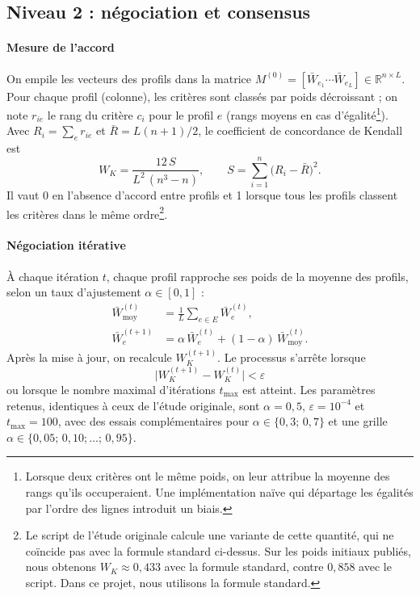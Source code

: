 \documentclass[11pt,a4paper]{article}
\newcommand{\Wbar}{\bar{W}}
\newcommand{\Wmoy}{\bar{W}_{\mathrm{moy}}}
\begin{document}
\subsection{Niveau 2 : négociation et consensus}

\paragraph{Mesure de l'accord} On empile les vecteurs des profils dans la matrice $M^{(0)}=[\Wbar_{e_1}\cdots\Wbar_{e_L}]\in\mathbb{R}^{n\times L}$. Pour chaque profil (colonne), les critères sont classés par poids décroissant ; on note $r_{ie}$ le rang du critère $c_i$ pour le profil $e$ (rangs moyens en cas d'égalité\footnote{Lorsque deux critères ont le même poids, on leur attribue la moyenne des rangs qu'ils occuperaient. Une implémentation naïve qui départage les égalités par l'ordre des lignes introduit un biais.}). Avec $R_i=\sum_e r_{ie}$ et $\bar R=L(n+1)/2$, le coefficient de concordance de Kendall~\cite{kendall} est
\begin{equation}\label{eq:kendall}
  W_K=\frac{12\,S}{L^2\,(n^3-n)},\qquad S=\sum_{i=1}^{n}\bigl(R_i-\bar R\bigr)^2 .
\end{equation}
Il vaut 0 en l'absence d'accord entre profils et 1 lorsque tous les profils classent les critères dans le même ordre\footnote{Le script de l'étude originale calcule une variante de cette quantité, qui ne coïncide pas avec la formule standard ci-dessus. Sur les poids initiaux publiés, nous obtenons $W_K\approx0{,}433$ avec la formule standard, contre $0{,}858$ avec le script. Dans ce projet, nous utilisons la formule standard.}.

\paragraph{Négociation itérative} À chaque itération $t$, chaque profil rapproche ses poids de la moyenne des profils, selon un taux d'ajustement $\alpha\in[0,1]$ :
\begin{align}
  \Wmoy^{(t)} &= \frac{1}{L}\sum_{e\in E}\Wbar_e^{(t)}, \label{eq:moy}\\
  \Wbar_e^{(t+1)} &= \alpha\,\Wbar_e^{(t)}+(1-\alpha)\,\Wmoy^{(t)} . \label{eq:maj}
\end{align}
Après la mise à jour, on recalcule $W_K^{(t+1)}$. Le processus s'arrête lorsque
\begin{equation}\label{eq:arret}
  \bigl|W_K^{(t+1)}-W_K^{(t)}\bigr|<\varepsilon
\end{equation}
ou lorsque le nombre maximal d'itérations $t_{\max}$ est atteint. Les paramètres retenus, identiques à ceux de l'étude originale, sont $\alpha=0{,}5$, $\varepsilon=10^{-4}$ et $t_{\max}=100$, avec des essais complémentaires pour $\alpha\in\{0{,}3;\,0{,}7\}$ et une grille $\alpha\in\{0{,}05;\,0{,}10;\dots;\,0{,}95\}$.
\end{document}
